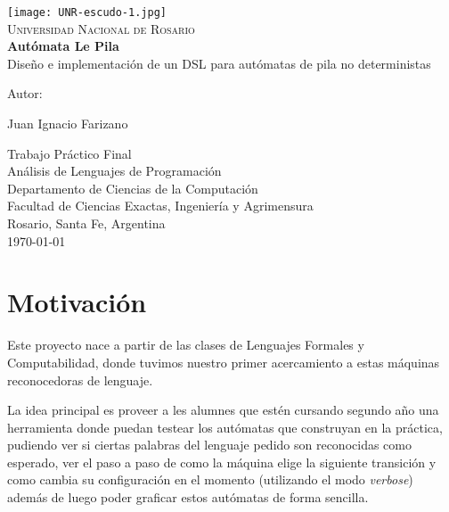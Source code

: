 \documentclass[12pt,a4paper]{article}
\begin{document}

\begin{titlepage}
\thispagestyle{empty}
\begin{center}
  \texttt{[image: UNR-escudo-1.jpg]}
  \\[0.5cm]
  \textsc{\LARGE Universidad Nacional de Rosario}\\[1.5cm]
  
  {\huge \textbf{Autómata Le Pila} \\[0.4cm]}
  {\large Diseño e implementación de un DSL para autómatas de pila no deterministas} \\
  \noindent
  
  \vfill
  \vfill
  \vfill
  {\Large Autor: \par}
  {\Large Juan Ignacio Farizano\par}

  \vfill
  Trabajo Práctico Final \\
  Análisis de Lenguajes de Programación \\
  Departamento de Ciencias de la Computaci\'on\\
  Facultad de Ciencias Exactas, Ingenier\'ia y Agrimensura\\
  Rosario, Santa Fe, Argentina\\[0.4cm]
  {\large \today} 
\end{center}
\end{titlepage}


\tableofcontents

\newpage

\section{Motivación}
Este proyecto nace a partir de las clases de Lenguajes Formales y Computabilidad,
donde tuvimos nuestro primer acercamiento a estas máquinas reconocedoras de lenguaje.

La idea principal es proveer a les alumnes que estén cursando segundo año una
herramienta donde puedan testear los autómatas que construyan en la práctica,
pudiendo ver si ciertas palabras del lenguaje pedido son reconocidas como esperado,
ver el paso a paso de como la máquina elige la siguiente transición y como cambia
su configuración en el momento (utilizando el modo \emph{verbose}) además de luego
poder graficar estos autómatas de forma sencilla.
\end{document}
